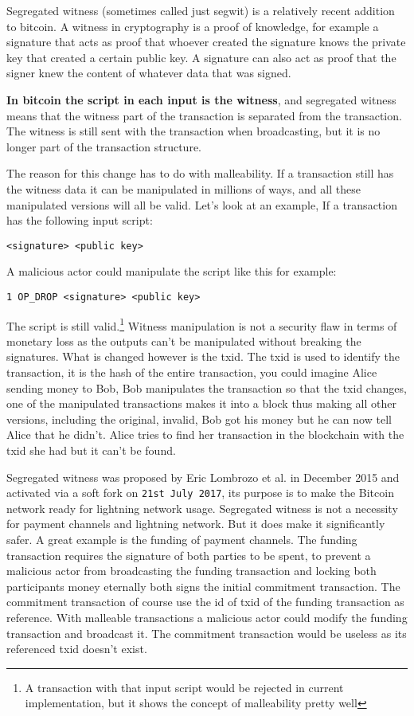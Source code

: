 \label{segwit}
Segregated witness (sometimes called just segwit) is a relatively recent addition to bitcoin. A witness in cryptography is a proof of knowledge, for example a signature that acts as proof that whoever created the signature knows the private key that created a certain public key. A signature can also act as proof that the signer knew the content of whatever data that was signed.\cite{antonopoulos_2017}\cite{ecc_def}

\textbf{In bitcoin the script in each input is the witness}, and segregated witness means that the witness part of the transaction is separated from the transaction. The witness is still sent with the transaction when broadcasting, but it is no longer part of the transaction structure.\cite{antonopoulos_2017}\cite{segwitbip}

The reason for this change has to do with malleability. If a transaction still has the witness data it can be manipulated in millions of ways, and all these manipulated versions will all be valid. Let's look at an example, If a transaction has the following input script:

\texttt{<signature> <public key>}

A malicious actor could manipulate the script like this for example:

\texttt{1 OP\_DROP <signature> <public key>}

The script is still valid.\footnote{A transaction with that input script would be rejected in current implementation, but it shows the concept of malleability pretty well} Witness manipulation is not a security flaw in terms of monetary loss as the outputs can't be manipulated without breaking the signatures. What is changed however is the txid. The txid is used to identify the transaction, it is the hash of the entire transaction, you could imagine Alice sending money to Bob, Bob manipulates the transaction so that the txid changes, one of the manipulated transactions makes it into a block thus making all other versions, including the original, invalid, Bob got his money but he can now tell Alice that he didn't. Alice tries to find her transaction in the blockchain with the txid she had but it can't be found.

Segregated witness was proposed by Eric Lombrozo et al. in December 2015 and activated via a soft fork on \texttt{21st July 2017}\cite{antonopoulos_2017}\cite{segwitbip}, its purpose is to make the Bitcoin network ready for lightning network usage.\cite{segwitbip} Segregated witness is not a necessity for payment channels and lightning network. But it does make it significantly safer.\cite{segwitbip} A great example is the funding of payment channels. The funding transaction requires the signature of both parties to be spent, to prevent a malicious actor from broadcasting the funding transaction and locking both participants money eternally both signs the initial commitment transaction. The commitment transaction of course use the id of txid of the funding transaction as reference. With malleable transactions a malicious actor could modify the funding transaction and broadcast it. The commitment transaction would be useless as its referenced txid doesn't exist.

